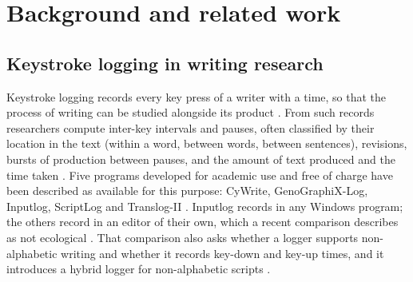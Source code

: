 
\section{Background and related work}
\label{sec:related}

\subsection{Keystroke logging in writing research}
\label{sec:related-logging}

Keystroke logging records every key press of a writer with a time, so that the process of writing can be studied
alongside its product \citep{wengelin2023}. From such records researchers compute inter-key intervals and
pauses, often classified by their location in the text (within a word, between words, between sentences), revisions,
bursts of production between pauses, and the amount of text produced and the time taken \citep{conijn2019}. Five programs developed for academic
use and free of charge have been described as available for this purpose: CyWrite, GenoGraphiX-Log, Inputlog,
ScriptLog and Translog-II \citep{wengelin2023}. Inputlog records in any Windows program; the others record in an editor
of their own, which a recent comparison describes as not ecological \citep{crotti2026}. That comparison also asks
whether a logger supports non-alphabetic writing and whether it records key-down and key-up times, and it introduces a
hybrid logger for non-alphabetic scripts \citep{crotti2026}.

